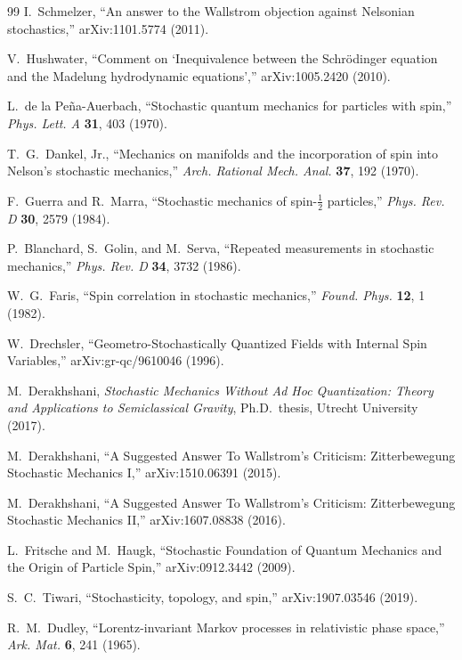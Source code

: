 \documentclass[11pt]{article}
\begin{document}
\begin{thebibliography}{99}
 I.~Schmelzer, ``An answer to the Wallstrom objection against Nelsonian stochastics,'' arXiv:1101.5774 (2011).

 V.~Hushwater, ``Comment on `Inequivalence between the Schrödinger equation and the Madelung hydrodynamic equations','' arXiv:1005.2420 (2010).

 L.~de la Peña-Auerbach, ``Stochastic quantum mechanics for particles with spin,'' \emph{Phys. Lett. A} \textbf{31}, 403 (1970).

 T.~G.~Dankel, Jr., ``Mechanics on manifolds and the incorporation of spin into Nelson's stochastic mechanics,'' \emph{Arch. Rational Mech. Anal.} \textbf{37}, 192 (1970).

 F.~Guerra and R.~Marra, ``Stochastic mechanics of spin-$\tfrac12$ particles,'' \emph{Phys. Rev. D} \textbf{30}, 2579 (1984).

 P.~Blanchard, S.~Golin, and M.~Serva, ``Repeated measurements in stochastic mechanics,'' \emph{Phys. Rev. D} \textbf{34}, 3732 (1986).

 W.~G.~Faris, ``Spin correlation in stochastic mechanics,'' \emph{Found. Phys.} \textbf{12}, 1 (1982).

 W.~Drechsler, ``Geometro-Stochastically Quantized Fields with Internal Spin Variables,'' arXiv:gr-qc/9610046 (1996).

 M.~Derakhshani, \emph{Stochastic Mechanics Without Ad Hoc Quantization: Theory and Applications to Semiclassical Gravity}, Ph.D.\ thesis, Utrecht University (2017).

 M.~Derakhshani, ``A Suggested Answer To Wallstrom's Criticism: Zitterbewegung Stochastic Mechanics I,'' arXiv:1510.06391 (2015).

 M.~Derakhshani, ``A Suggested Answer To Wallstrom's Criticism: Zitterbewegung Stochastic Mechanics II,'' arXiv:1607.08838 (2016).

 L.~Fritsche and M.~Haugk, ``Stochastic Foundation of Quantum Mechanics and the Origin of Particle Spin,'' arXiv:0912.3442 (2009).

 S.~C.~Tiwari, ``Stochasticity, topology, and spin,'' arXiv:1907.03546 (2019).

 R.~M.~Dudley, ``Lorentz-invariant Markov processes in relativistic phase space,'' \emph{Ark. Mat.} \textbf{6}, 241 (1965).


\end{thebibliography}
\end{document}
